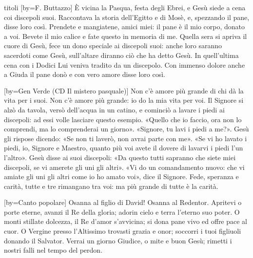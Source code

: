 \begin{songs}{titoli}
[by={F. Buttazzo}]
\beginverse
È vicina la Pasqua, festa degli Ebrei,
e Gesù siede a cena coi discepoli suoi.
Raccontava la storia dell'Egitto e di Mosè,
e, spezzando il pane, disse loro così.
\endverse
\beginchorus
Prendete e mangiatene, amici miei: il pane è il mio corpo, donato a voi.
Bevete il mio calice e fate questo in memoria di me.
\endchorus
\beginverse
Quella sera si apriva il cuore di Gesù,
fece un dono speciale ai discepoli suoi:
anche loro saranno sacerdoti come Gesù,
sull'altare diranno ciò che ha detto Gesù.
\endverse
\beginverse
In quell'ultima cena con i Dodici
Lui veniva tradito da un discepolo.
Con immenso dolore anche a Giuda il pane donò
e con vero amore disse loro così.
\endverse
\endsong

[by={Gen Verde (CD Il mistero pasquale)}]
\beginchorus
Non c'è amore più grande di chi dà la vita per i suoi.
Non c'è amore più grande: io do la mia vita per voi.
\endchorus
\beginverse
Il Signore si alzò da tavola,
versò dell'acqua in un catino,
e cominciò a lavare i piedi ai discepoli:
ad essi volle lasciare questo esempio.
\endverse
\beginverse
«Quello che io faccio, ora non lo comprendi,
ma lo comprenderai un giorno».
«Signore, tu lavi i piedi a me?».
Gesù gli rispose dicendo:
«Se non ti laverò, non avrai parte con me».
\endverse
\beginverse
«Se vi ho lavato i piedi,
io, Signore e Maestro,
quanto più voi avete il dovere
di lavarvi i piedi l'un l'altro».
\endverse
\beginverse
Gesù disse ai suoi discepoli:
«Da questo tutti sapranno
che siete miei discepoli,
se vi amerete gli uni gli altri».
\endverse
\beginverse
«Vi do un comandamento nuovo:
che vi amiate gli uni gli altri
come io ho amato voi»,
dice il Signore.
\endverse
\beginverse
Fede, speranza e carità,
tutte e tre rimangano tra voi:
ma più grande di tutte è la carità.
\endverse
\endsong

[by={Canto popolare}]
\beginchorus
Osanna al figlio di David! Osanna al Redentor. 
\endchorus
\beginverse
Apritevi o porte eterne, avanzi il Re della gloria;
adorin cielo e terra l'eterno suo poter.
\endverse
\beginverse
O monti stillate dolcezza, il Re d'amor s'avvicina;
si dona pane vivo ed offre pace al cuor.
\endverse
\beginverse
O Vergine presso l'Altissimo trovasti grazia e onor;
soccorri i tuoi figliuoli donando il Salvator.
\endverse
\beginverse
Verrai un giorno Giudice, o mite e buon Gesù;
rimetti i nostri falli nel tempo del perdon.
\endverse
\endsong


\end{songs}
